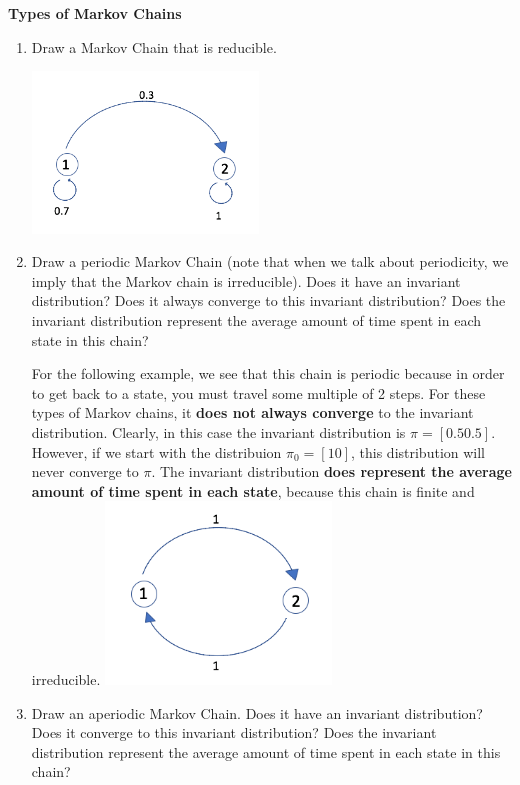 \question \textbf{Types of Markov Chains}
\begin{enumerate}[label=(\alph*)]
\item Draw a Markov Chain that is reducible.
\begin{solution}[1.75cm]
\includegraphics[width=6cm]{reducible.png}
\end{solution}
\item Draw a periodic Markov Chain (note that when we talk about periodicity, we imply that the Markov chain is irreducible). Does it have an invariant distribution? Does it always converge to this invariant distribution? Does the invariant distribution represent the average amount of time spent in each state in this chain? 
\begin{solution}[1.75cm]
For the following example, we see that this chain is periodic because in order to get back to a state, you must travel some multiple of 2 steps. For these types of Markov chains, it \textbf{does not always converge} to the invariant distribution. Clearly, in this case the invariant distribution is $\pi = [0.5 0.5]$. However, if we start with the distribuion $\pi_0 = [1 0]$, this distribution will never converge to $\pi$. The invariant distribution \textbf{does represent the average amount of time spent in each state}, because this chain is finite and irreducible. 
\includegraphics[width=6cm]{periodic.png}
\end{solution}
\item Draw an aperiodic Markov Chain. Does it have an invariant distribution? Does it converge to this
invariant distribution? Does the invariant distribution represent the average amount of time spent in each state in this chain? 

\end{enumerate}
